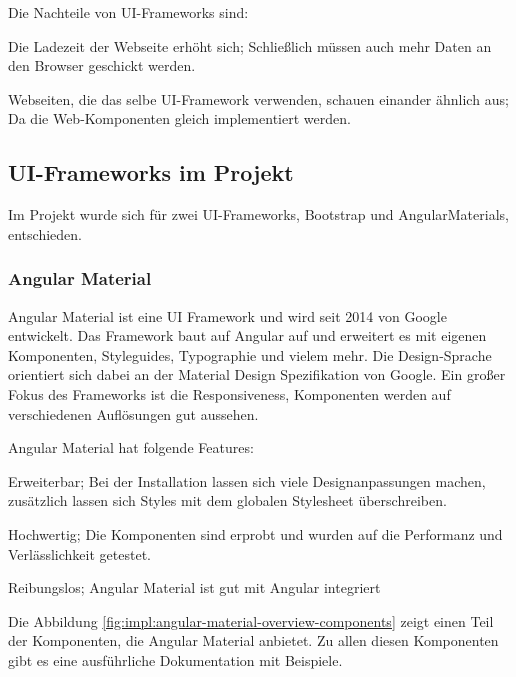 Die Nachteile von UI-Frameworks sind: \cite{CssFrameworkExplaination, BestCSSFrameworksin2022}
\begin{compactitem}
    \item Die Ladezeit der Webseite erhöht sich;
    Schließlich müssen auch mehr Daten an den Browser geschickt werden.
    \item Webseiten, die das selbe UI-Framework verwenden, schauen einander ähnlich aus;
    Da die Web-Komponenten gleich implementiert werden.
\end{compactitem}


\subsection{UI-Frameworks im Projekt}
Im Projekt wurde sich für zwei UI-Frameworks, Bootstrap und AngularMaterials, entschieden.


\subsubsection{Angular Material}
Angular Material ist eine UI Framework und wird seit 2014 von Google entwickelt. Das Framework baut auf Angular auf und erweitert es mit eigenen Komponenten, Styleguides, Typographie und vielem mehr. Die Design-Sprache orientiert sich dabei an der Material Design Spezifikation von Google. Ein großer Fokus des Frameworks ist die Responsiveness, Komponenten werden auf verschiedenen Auflösungen gut aussehen. \cite{JavaPointAngularMaterial, WhatAngularMaterial}


Angular Material hat folgende Features: \cite{JavaPointAngularMaterial, WhatAngularMaterial}
\begin{compactitem}
    \item Erweiterbar; Bei der Installation lassen sich viele Designanpassungen machen, zusätzlich lassen sich Styles mit dem globalen Stylesheet überschreiben. 
    \item Hochwertig; Die Komponenten sind erprobt und wurden auf die Performanz und Verlässlichkeit getestet.
    \item Reibungslos; Angular Material ist gut mit Angular integriert
\end{compactitem}

Die Abbildung \ref{fig:impl:angular-material-overview-components} zeigt einen Teil der Komponenten, die Angular Material anbietet. Zu allen diesen Komponenten gibt es eine ausführliche Dokumentation mit Beispiele. \cite{JavaPointAngularMaterial, WhatAngularMaterial}

